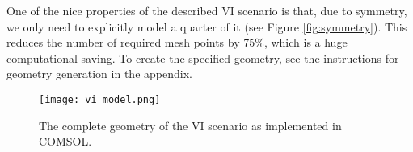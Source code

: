 One of the nice properties of the described VI scenario is that, due to symmetry, we only need to explicitly model a quarter of it (see Figure \ref{fig:symmetry}).
This reduces the number of required mesh points by 75\%, which is a huge computational saving.
To create the specified geometry, see the instructions for geometry generation in the appendix.

\begin{figure}[htb!]
  \centering
  \texttt{[image: vi\_model.png]}
  \caption[VI model geometry in COMSOL]{The complete geometry of the VI scenario as implemented in COMSOL.}
  \label{fig:geometry}
\end{figure}
